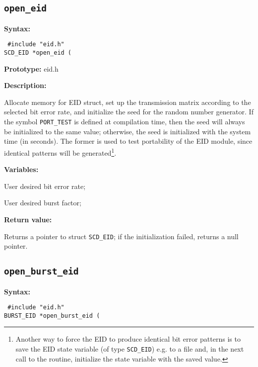 \subsection{{\tt open\_eid}}

{\bf Syntax: }

{\tt
\#include "eid.h"\\
SCD\_EID *open\_eid (
}

{\bf Prototype: }    eid.h

{\bf Description: }

Allocate memory for EID struct, set up the transmission matrix
according to the selected bit error rate, and initialize the seed for
the random number generator. If the symbol {\tt PORT\_TEST} is defined
at compilation time, then the seed will always be initialized to the
same value; otherwise, the seed is initialized with the system time
(in seconds). The former is used to test portability of the EID
module, since identical patterns will be generated\footnote{\SF
Another way to force the EID to produce identical bit error patterns
is to save the EID state variable (of type {\tt SCD\_EID}) e.g. to a
file and, in the next call to the routine, initialize the state
variable with the saved value.}.

{\bf Variables: }
\begin{Descr}{\DescrLen}
\item[\pbox{20mm}{\em ber}] %
        User desired bit error rate;

\item[\pbox{20mm}{\em gamma}] %
        User desired burst factor;
\end{Descr}


{\bf Return value: }

Returns a pointer to struct {\tt SCD\_EID}; if the initialization failed,
returns a null pointer.



\subsection{{\tt open\_burst\_eid}}

{\bf Syntax: }

{\tt
\#include "eid.h"\\
BURST\_EID *open\_burst\_eid (
}

